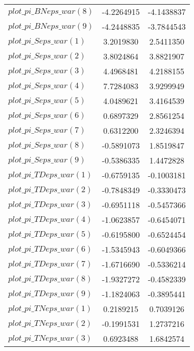 \begin{center}
\begin{longtable}{lcc}
$plot\_pi\_BN eps\_war (8)   $	 & 	     -4.2264915	 & 	     -4.1438837 \\ 
$plot\_pi\_BN eps\_war (9)   $	 & 	     -4.2448835	 & 	     -3.7844543 \\ 
$plot\_pi\_S eps\_war (1)    $	 & 	      3.2019830	 & 	      2.5411350 \\ 
$plot\_pi\_S eps\_war (2)    $	 & 	      3.8024864	 & 	      3.8821907 \\ 
$plot\_pi\_S eps\_war (3)    $	 & 	      4.4968481	 & 	      4.2188155 \\ 
$plot\_pi\_S eps\_war (4)    $	 & 	      7.7284083	 & 	      3.9299949 \\ 
$plot\_pi\_S eps\_war (5)    $	 & 	      4.0489621	 & 	      3.4164539 \\ 
$plot\_pi\_S eps\_war (6)    $	 & 	      0.6897329	 & 	      2.8561254 \\ 
$plot\_pi\_S eps\_war (7)    $	 & 	      0.6312200	 & 	      2.3246394 \\ 
$plot\_pi\_S eps\_war (8)    $	 & 	     -0.5891073	 & 	      1.8519847 \\ 
$plot\_pi\_S eps\_war (9)    $	 & 	     -0.5386335	 & 	      1.4472828 \\ 
$plot\_pi\_TD eps\_war (1)   $	 & 	     -0.6759135	 & 	     -0.1003181 \\ 
$plot\_pi\_TD eps\_war (2)   $	 & 	     -0.7848349	 & 	     -0.3330473 \\ 
$plot\_pi\_TD eps\_war (3)   $	 & 	     -0.6951118	 & 	     -0.5457366 \\ 
$plot\_pi\_TD eps\_war (4)   $	 & 	     -1.0623857	 & 	     -0.6454071 \\ 
$plot\_pi\_TD eps\_war (5)   $	 & 	     -0.6195800	 & 	     -0.6524454 \\ 
$plot\_pi\_TD eps\_war (6)   $	 & 	     -1.5345943	 & 	     -0.6049366 \\ 
$plot\_pi\_TD eps\_war (7)   $	 & 	     -1.6716690	 & 	     -0.5336214 \\ 
$plot\_pi\_TD eps\_war (8)   $	 & 	     -1.9327272	 & 	     -0.4582339 \\ 
$plot\_pi\_TD eps\_war (9)   $	 & 	     -1.1824063	 & 	     -0.3895441 \\ 
$plot\_pi\_TN eps\_war (1)   $	 & 	      0.2189215	 & 	      0.7039126 \\ 
$plot\_pi\_TN eps\_war (2)   $	 & 	     -0.1991531	 & 	      1.2737216 \\ 
$plot\_pi\_TN eps\_war (3)   $	 & 	      0.6923488	 & 	      1.6842574 \\ 

\end{longtable}
\end{center}
